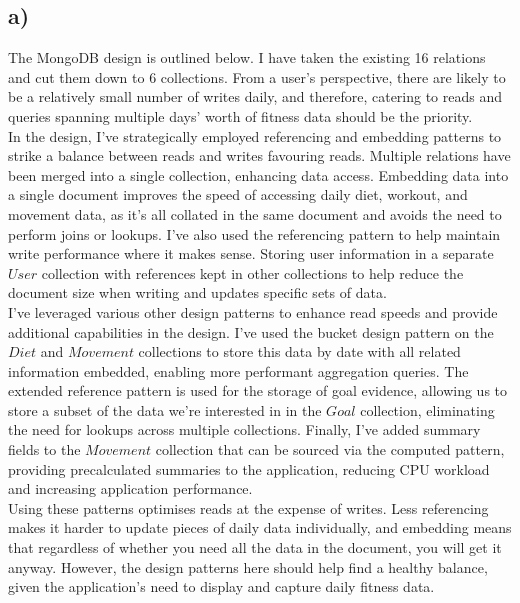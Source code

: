\documentclass{article}
\begin{document}
\subsection*{\small a)}
The MongoDB design is outlined below. I have taken the existing 16 relations and cut them down to 6 collections. From a user's perspective, there are likely to be a relatively small number of writes daily, and therefore, catering to reads and queries spanning multiple days' worth of fitness data should be the priority. \\
\newline
In the design, I've strategically employed referencing and embedding patterns to strike a balance between reads and writes favouring reads. Multiple relations have been merged into a single collection, enhancing data access. Embedding data into a single document improves the speed of accessing daily diet, workout, and movement data, as it's all collated in the same document and avoids the need to perform joins or lookups. I've also used the referencing pattern to help maintain write performance where it makes sense. Storing user information in a separate $User$ collection with references kept in other collections to help reduce the document size when writing and updates specific sets of data. \\
\newline
I've leveraged various other design patterns to enhance read speeds and provide additional capabilities in the design. I've used the bucket design pattern on the $Diet$ and $Movement$ collections to store this data by date with all related information embedded, enabling more performant aggregation queries. The extended reference pattern is used for the storage of goal evidence, allowing us to store a subset of the data we're interested in in the $Goal$ collection, eliminating the need for lookups across multiple collections. Finally, I've added summary fields to the $Movement$ collection that can be sourced via the computed pattern, providing precalculated summaries to the application, reducing CPU workload and increasing application performance. \\
\newline
Using these patterns optimises reads at the expense of writes. Less referencing makes it harder to update pieces of daily data individually, and embedding means that regardless of whether you need all the data in the document, you will get it anyway. However, the design patterns here should help find a healthy balance, given the application's need to display and capture daily fitness data. \\
\end{document}
